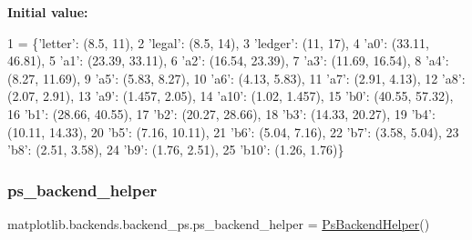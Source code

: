 {\bfseries Initial value\+:}
\begin{DoxyCode}
1 =  \{\textcolor{stringliteral}{'letter'}: (8.5, 11),
2              \textcolor{stringliteral}{'legal'}: (8.5, 14),
3              \textcolor{stringliteral}{'ledger'}: (11, 17),
4              \textcolor{stringliteral}{'a0'}: (33.11, 46.81),
5              \textcolor{stringliteral}{'a1'}: (23.39, 33.11),
6              \textcolor{stringliteral}{'a2'}: (16.54, 23.39),
7              \textcolor{stringliteral}{'a3'}: (11.69, 16.54),
8              \textcolor{stringliteral}{'a4'}: (8.27, 11.69),
9              \textcolor{stringliteral}{'a5'}: (5.83, 8.27),
10              \textcolor{stringliteral}{'a6'}: (4.13, 5.83),
11              \textcolor{stringliteral}{'a7'}: (2.91, 4.13),
12              \textcolor{stringliteral}{'a8'}: (2.07, 2.91),
13              \textcolor{stringliteral}{'a9'}: (1.457, 2.05),
14              \textcolor{stringliteral}{'a10'}: (1.02, 1.457),
15              \textcolor{stringliteral}{'b0'}: (40.55, 57.32),
16              \textcolor{stringliteral}{'b1'}: (28.66, 40.55),
17              \textcolor{stringliteral}{'b2'}: (20.27, 28.66),
18              \textcolor{stringliteral}{'b3'}: (14.33, 20.27),
19              \textcolor{stringliteral}{'b4'}: (10.11, 14.33),
20              \textcolor{stringliteral}{'b5'}: (7.16, 10.11),
21              \textcolor{stringliteral}{'b6'}: (5.04, 7.16),
22              \textcolor{stringliteral}{'b7'}: (3.58, 5.04),
23              \textcolor{stringliteral}{'b8'}: (2.51, 3.58),
24              \textcolor{stringliteral}{'b9'}: (1.76, 2.51),
25              \textcolor{stringliteral}{'b10'}: (1.26, 1.76)\}
\end{DoxyCode}
\mbox{\label{namespacematplotlib_1_1backends_1_1backend__ps_a775472009465547b35039f1a7baac84b}} 
\subsubsection{\texorpdfstring{ps\+\_\+backend\+\_\+helper}{ps\_backend\_helper}}
{\footnotesize\ttfamily matplotlib.\+backends.\+backend\+\_\+ps.\+ps\+\_\+backend\+\_\+helper = \hyperlink{classmatplotlib_1_1backends_1_1backend__ps_1_1PsBackendHelper}{Ps\+Backend\+Helper}()}

